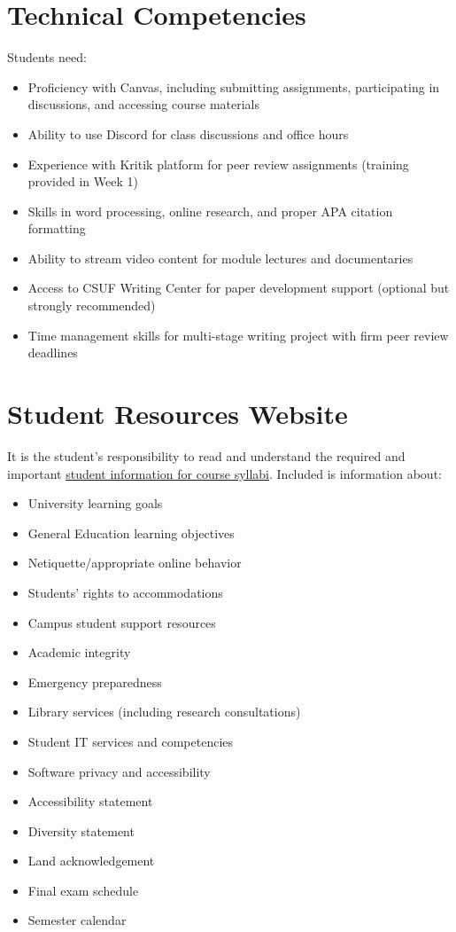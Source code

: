 \documentclass[12pt]{article}     %
\begin{document}
\section{Technical Competencies}
Students need:
\begin{itemize}
\item Proficiency with Canvas, including submitting assignments, participating in discussions, and accessing course materials
\item Ability to use Discord for class discussions and office hours
\item Experience with Kritik platform for peer review assignments (training provided in Week 1)
\item Skills in word processing, online research, and proper APA citation formatting
\item Ability to stream video content for module lectures and documentaries
\item Access to CSUF Writing Center for paper development support (optional but strongly recommended)
\item Time management skills for multi-stage writing project with firm peer review deadlines
\end{itemize}

\section{Student Resources Website}
It is the student's responsibility to read and understand the required and important \href{https://fdc.fullerton.edu/teaching/student-info-syllabi.html}{student information for course syllabi}. Included is information about:

\begin{itemize}
\item University learning goals
\item General Education learning objectives
\item Netiquette/appropriate online behavior
\item Students' rights to accommodations
\item Campus student support resources
\item Academic integrity
\item Emergency preparedness
\item Library services (including research consultations)
\item Student IT services and competencies
\item Software privacy and accessibility
\item Accessibility statement
\item Diversity statement
\item Land acknowledgement
\item Final exam schedule
\item Semester calendar
\end{itemize}
\end{document}
